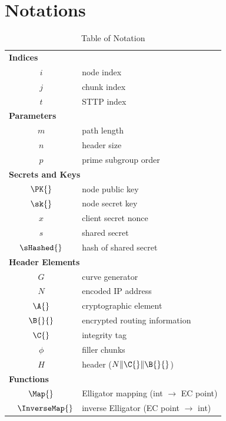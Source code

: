 \section{Notations}
\label{app:table_notation}

\begin{table}[H]
    \caption{Table of Notation}
    \centering

    \begin{tabular}{c l}
        \toprule
        \multicolumn{2}{l}{\textbf{Indices}}\\
        $i$          & node index \\
        $j$          & chunk index \\
        $t$          & STTP index \\[2pt]

        \multicolumn{2}{l}{\textbf{Parameters}}\\
        $m$          & path length \\
        $n$          & header size \\
        $p$          & prime subgroup order \\[2pt]
        
        \multicolumn{2}{l}{\textbf{Secrets and Keys}}\\
        $\PK{}$      & node public key \\
        $\sk{}$      & node secret key \\
        $x$          & client secret nonce \\
        $s$          & shared secret \\
        $\sHashed{}$ & hash of shared secret \\[2pt]

        \multicolumn{2}{l}{\textbf{Header Elements}}\\
        $G$          & curve generator \\
        $N$	         & encoded IP address \\
        $\A{}$       & cryptographic element \\
        $\B{}{}$     & encrypted routing information \\
        $\C{}$       & integrity tag \\
        $\phi$       & filler chunks \\
        $H$          & header ($N \| \C{} \| \B{}{}$) \\[2pt]

        \multicolumn{2}{l}{\textbf{Functions}}\\
        $\Map{}$         & Elligator mapping (int $\rightarrow$ EC point) \\
        $\hspace{3.5mm}\InverseMap{}$  & inverse Elligator (EC point $\rightarrow$ int) \\
        \bottomrule
    \end{tabular}
\end{table}
